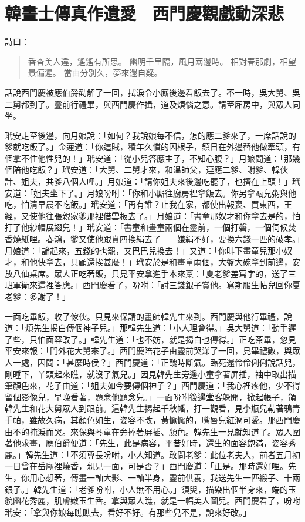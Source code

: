 
\chapter{韓畫士傳真作遺愛　西門慶觀戲動深悲}

詩曰：
\begin{quote}
香杳美人違，遙遙有所思。
幽明千里隔，風月兩邊時。
相對春那劇，相望景偏遲。
當由分別久，夢來還自疑。
\end{quote}

話說西門慶被應伯爵勸解了一回，拭淚令小廝後邊看飯去了。不一時，吳大舅、吳二舅都到了。靈前行禮畢，與西門慶作揖，道及煩惱之意。請至廂房中，與眾人同坐。

玳安走至後邊，向月娘說：「如何？我說娘每不信，怎的應二爹來了，一席話說的爹就吃飯了。」金蓮道：「你這賊，積年久慣的囚根子，鎮日在外邊替他做牽頭，有個拿不住他性兒的！」玳安道：「從小兒答應主子，不知心腹？」月娘問道：「那幾個陪他吃飯？」玳安道：「大舅、二舅才來，和溫師父，連應二爹、謝爹、韓伙計、姐夫，共爹八個人哩。」月娘道：「請你姐夫來後邊吃罷了，也擠在上頭！」玳安道：「姐夫坐下了。」月娘吩咐：「你和小廝往廚房裡拿飯去。你另拿甌兒粥與他吃，怕清早晨不吃飯。」玳安道：「再有誰？止我在家，都使出報喪、買東西，王經，又使他往張親家爹那裡借雲板去了。」月娘道：「書童那奴才和你拿去是的，怕打了他紗帽展翅兒！」玳安道：「書童和畫童兩個在靈前，一個打磐，一個伺候焚香燒紙哩。春鴻，爹又使他跟賁四換絹去了——嫌絹不好，要換六錢一匹的破孝。」月娘道：「論起來，五錢的也罷，又巴巴兒換去！」又道：「你叫下畫童兒那小奴才，和他快拿去，只顧還挨甚麼！」玳安於是和畫童兩個，大盤大碗拿到前邊，安放八仙桌席。眾人正吃著飯，只見平安拿進手本來稟：「夏老爹差寫字的，送了三班軍衛來這裡答應。」西門慶看了，吩咐：「討三錢銀子賞他。寫期服生帖兒回你夏老爹：多謝了！」

一面吃畢飯，收了傢伙。只見來保請的畫師韓先生來到。西門慶與他行畢禮，說道：「煩先生揭白傳個神子兒。」那韓先生道：「小人理會得。」吳大舅道：「動手遲了些，只怕面容改了。」韓先生道：「也不妨，就是揭白也傳得。」正吃茶畢，忽見平安來報：「門外花大舅來了。」西門慶陪花子由靈前哭涕了一回，見畢禮數，與眾人一處，因問：「甚麼時侯？」西門慶道：「正醜時斷氣。臨死還伶伶俐俐說話兒，剛睡下，丫頭起來瞧，就沒了氣兒。」因見韓先生旁邊小童拿著屏插，袖中取出描筆顏色來，花子由道：「姐夫如今要傳個神子？」西門慶道：「我心裡疼他，少不得留個影像兒，早晚看著，題念他題念兒。」一面吩咐後邊堂客躲開，掀起帳子，領韓先生和花大舅眾人到跟前。這韓先生揭起千秋幡，打一觀看，見李瓶兒勒著鴉青手帕，雖故久病，其顏色如生，姿容不改，黃懨懨的，嘴唇兒紅潤可愛。那西門慶由不的掩淚而哭。來保與琴童在旁捧著屏插、顏色。韓先生一見就知道了。眾人圍著他求畫，應伯爵便道：「先生，此是病容，平昔好時，還生的面容飽滿，姿容秀麗。」韓先生道：「不須尊長吩咐，小人知道。敢問老爹：此位老夫人，前者五月初一日曾在岳廟裡燒香，親見一面，可是否？」西門慶道：「正是。那時還好哩。先生，你用心想著，傳畫一軸大影、一軸半身，靈前供養，我送先生一匹緞子、十兩銀子。」韓先生道：「老爹吩咐，小人無不用心。」須臾，描染出個半身來，端的玉貌幽花秀麗，肌膚嫩玉生香。拿與眾人瞧，就是一幅美人圖兒。西門慶看了，吩咐玳安：「拿與你娘每瞧瞧去，看好不好。有那些兒不是，說來好改。」

